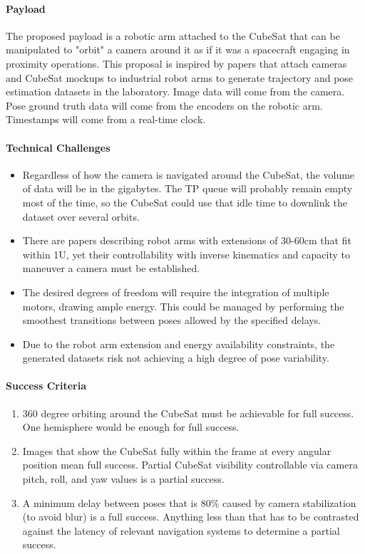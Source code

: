 \documentclass[11pt]{article}
\begin{document}
\paragraph{Payload} The proposed payload is a robotic arm attached to the CubeSat that can be manipulated to "orbit" a camera around it as if it was a spacecraft engaging in proximity operations.
This proposal is inspired by papers \cite{musallam2023cubesatcdt, park2022speedplus} that attach cameras and CubeSat mockups to industrial robot arms to generate trajectory and pose estimation datasets in the laboratory.
Image data will come from the camera. Pose ground truth data will come from the encoders on the robotic arm. Timestamps will come from a real-time clock.

\paragraph{Technical Challenges}
\begin{itemize}
\item Regardless of how the camera is navigated around the CubeSat, the volume of data will be in the gigabytes. The TP queue will probably remain empty most of the time, so the CubeSat could use that idle time to downlink the dataset over several orbits.
\item There are papers \cite{liu2022cubot, foiani2025carm, groves2026docksat} describing robot arms with extensions of 30-60cm that fit within 1U, yet their controllability with inverse kinematics and capacity to maneuver a camera must be established.
\item The desired degrees of freedom will require the integration of multiple motors, drawing ample energy. This could be managed by performing the smoothest transitions between poses allowed by the specified delays.
\item Due to the robot arm extension and energy availability constraints, the generated datasets risk not achieving a high degree of pose variability.
\end{itemize}

\paragraph {Success Criteria}
\begin{enumerate}
\item 360 degree orbiting around the CubeSat must be achievable for full success. One hemisphere would be enough for full success.
\item Images that show the CubeSat fully within the frame at every angular position mean full success. Partial CubeSat visibility controllable via camera pitch, roll, and yaw values is a partial success.
\item A minimum delay between poses that is 80\% caused by camera stabilization (to avoid blur) is a full success. Anything less than that has to be contrasted against the latency of relevant navigation systems to determine a partial success.
\end{enumerate}
\end{document}
